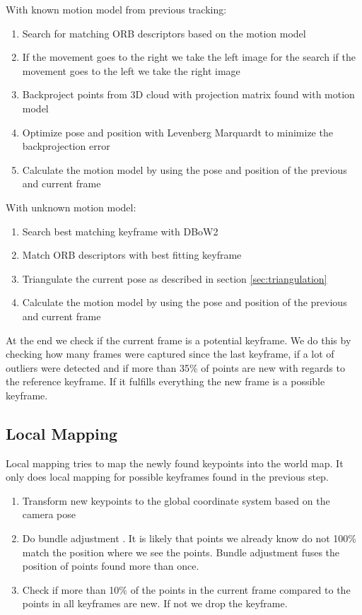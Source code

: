 \documentclass[11pt,a4paper,titlepage,oneside]{report}
\begin{document}
With known motion model from previous tracking:
\begin{enumerate}
	\item Search for matching ORB descriptors based on the motion model
	\item If the movement goes to the right we take the left image for the search if the movement goes to the left we take the right image
	\item Backproject points from 3D cloud with projection matrix found with motion model
	\item Optimize pose and position with Levenberg Marquardt \cite{levenbergmarquardt} to minimize the backprojection error
	\item Calculate the motion model by using the pose and position of the previous and current frame
\end{enumerate}

With unknown motion model:
\begin{enumerate}
	\item Search best matching keyframe with DBoW2 \cite{dbow}
	\item Match ORB descriptors with best fitting keyframe
	\item Triangulate the current pose as described in section \ref{sec:triangulation}
	\item Calculate the motion model by using the pose and position of the previous and current frame
\end{enumerate}

At the end we check if the current frame is a potential keyframe. We do this by checking how many frames were captured since the last keyframe, if a lot of outliers were detected and if more than 35\% of points are new with regards to the reference keyframe. If it fulfills everything the new frame is a possible keyframe.\\

\subsection{Local Mapping}
Local mapping tries to map the newly found keypoints into the world map. It only does local mapping for possible keyframes found in the previous step.
\begin{enumerate}
	\item Transform new keypoints to the global coordinate system based on the camera pose
	\item Do bundle adjustment \cite{bundleadjustment}. It is likely that points we already know do not 100\% match the position where we see the points. Bundle adjustment fuses the position of points found more than once.
	\item Check if more than 10\% of the points in the current frame compared to the points in all keyframes are new. If not we drop the keyframe.
\end{enumerate}
\end{document}
